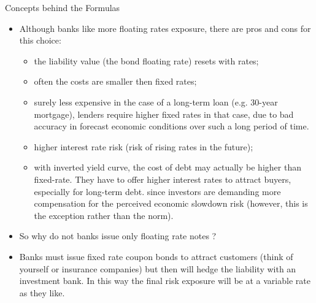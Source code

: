 \documentclass{beamer}
\begin{document}
\begin{frame}{Concepts behind the Formulas}
	\begin{itemize}
		\item<0->Although banks like more floating rates exposure, there are pros and cons for this choice: 
		\begin{itemize}
			\item<1-> [\goodcheck] the liability value (the bond floating rate) resets with rates;
			\item<1-> [\goodcheck] often the costs are smaller then fixed rates;
			\item<1-> [\goodcheck]surely less expensive in the case of a long-term loan (e.g. 30-year mortgage), lenders require higher fixed rates in that case, due to bad accuracy in forecast economic conditions over such a long period of time.
			\item<2-> [\badcheck] higher interest rate risk (risk of rising rates in the future);
			\item<2-> [\badcheck] with inverted yield curve, the cost of debt may actually be higher than fixed-rate. They have to offer higher interest rates to attract buyers, especially for long-term debt. since investors are demanding more compensation for the perceived economic slowdown risk (however, this is the exception rather than the norm).
		\end{itemize}
		\item<3-> So why do not banks issue only floating rate notes ?
		\item<4-> Banks must issue fixed rate coupon bonds to attract customers (think of yourself or insurance companies) but then will hedge the liability  with an investment bank. In this way the final risk exposure will be at a variable rate as they like. 
	\end{itemize}
\end{frame}

\end{document}
